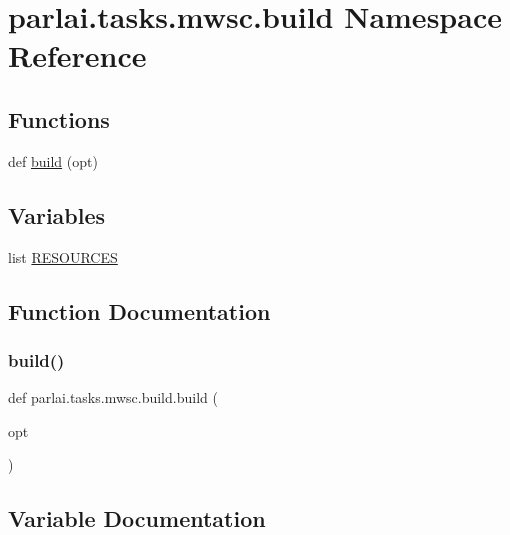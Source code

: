 \hypertarget{namespaceparlai_1_1tasks_1_1mwsc_1_1build}{}\section{parlai.\+tasks.\+mwsc.\+build Namespace Reference}
\label{namespaceparlai_1_1tasks_1_1mwsc_1_1build}
\subsection*{Functions}
\begin{DoxyCompactItemize}
\item 
def \hyperlink{namespaceparlai_1_1tasks_1_1mwsc_1_1build_a21fb0afba67df57037a48b4250337077}{build} (opt)
\end{DoxyCompactItemize}
\subsection*{Variables}
\begin{DoxyCompactItemize}
\item 
list \hyperlink{namespaceparlai_1_1tasks_1_1mwsc_1_1build_a99c1cce9a93f7e60bcc24d73b7072aeb}{R\+E\+S\+O\+U\+R\+C\+ES}
\end{DoxyCompactItemize}


\subsection{Function Documentation}
\mbox{\label{namespaceparlai_1_1tasks_1_1mwsc_1_1build_a21fb0afba67df57037a48b4250337077}} 
\subsubsection{\texorpdfstring{build()}{build()}}
{\footnotesize\ttfamily def parlai.\+tasks.\+mwsc.\+build.\+build (\begin{DoxyParamCaption}\item[{}]{opt }\end{DoxyParamCaption})}



\subsection{Variable Documentation}
\mbox{\label{namespaceparlai_1_1tasks_1_1mwsc_1_1build_a99c1cce9a93f7e60bcc24d73b7072aeb}} 
